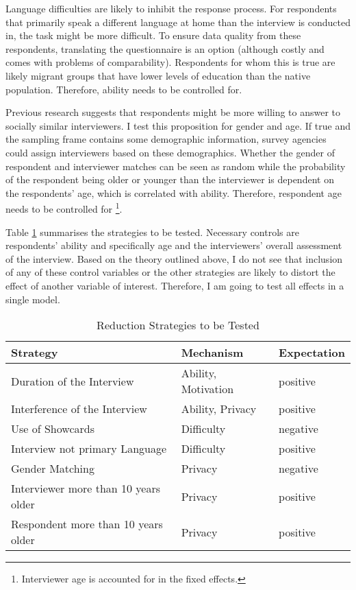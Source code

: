 \documentclass[a4paper,12pt]{article}
\begin{document}
Language difficulties are likely to inhibit the response process. For respondents that primarily speak a different language at home than the interview is conducted in, the task might be more difficult. To ensure data quality from these respondents, translating the questionnaire is an option (although costly and comes with problems of comparability). Respondents for whom this is true are likely migrant groups that have lower levels of education than the native population. Therefore, ability needs to be controlled for.

Previous research suggests that respondents might be more willing to answer to socially similar interviewers. I test this proposition for gender and age. If true and the sampling frame contains some demographic information, survey agencies could assign interviewers based on these demographics. Whether the gender of respondent and interviewer matches can be seen as random while the probability of the respondent being older or younger than the interviewer is dependent on the respondents' age, which is correlated with ability. Therefore, respondent age needs to be controlled for \footnote{Interviewer age is accounted for in the fixed effects.}.

Table \ref{table_strat} summarises the strategies to be tested. Necessary controls are respondents' ability and specifically age and the interviewers' overall assessment of the interview. Based on the theory outlined above, I do not see that inclusion of any of these control variables or the other strategies are likely to distort the effect of another variable of interest. Therefore, I am going to test all effects in a single model.

\begin{table}[h]
\caption{Reduction Strategies to be Tested}
\centering
\begin{tabular}{| l l l |}
\hline
Strategy & Mechanism & Expectation \\
\hline
Duration of the Interview & Ability, Motivation & positive \\
Interference of the Interview & Ability, Privacy & positive \\
Use of Showcards & Difficulty & negative \\
Interview not primary Language & Difficulty & positive \\
Gender Matching & Privacy & negative \\
Interviewer more than 10 years older & Privacy & positive \\
Respondent more than 10 years older & Privacy & positive \\
\hline
\end{tabular}
\label{table_strat}
\end{table}
\end{document}
